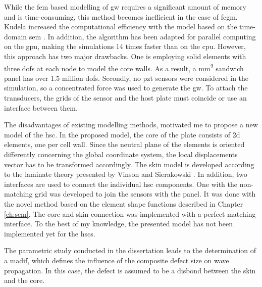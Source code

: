 While the \ac{fem} based modelling of \ac{gw} requires a significant amount of memory and is time-consuming, this method becomes inefficient in the case of \ac{fcgm}.
Kudela increased the computational efficiency with the model based on the time-domain \ac{sem} \cite{kudela2016parallel}.
In addition, the algorithm has been adapted for parallel computing on the \ac{gpu}, making the simulations 14 times faster than on the \ac{cpu}.
However, this approach has two major drawbacks. One is employing solid elements with three \acp{dof} at each node to model the core walls. As a result, a  \unit{\square\mm} sandwich panel has over 1.5 million \acp{dof}.
Secondly, no \ac{pzt} sensors were considered in the simulation, so a concentrated force was used to generate the \ac{gw}.
To attach the transducers, the grids of the sensor and the host plate must coincide or use an interface between them. 

The disadvantages of existing modelling methods, motivated me to propose a new model of the \ac{hsc}.
In the proposed model, the core of the plate consists of \ac{2d} elements, one per cell wall.
Since the neutral plane of the elements is oriented differently concerning the global coordinate system, the local displacements vector has to be transformed accordingly.
The skin model is developed according to the laminate theory presented by Vinson and Sierakowski \cite{vinson1993behavior}.
In addition, two interfaces are used to connect the individual \ac{hsc} components.
One with the non-matching grid was developed to join the sensors with the panel.
It was done with the novel method based on the element shape functions described in Chapter \ref{ch:sem}.
The core and skin connection was implemented with a perfect matching interface.
To the best of my knowledge, the presented model has not been implemented yet for the \acp{hsc}.

The parametric study conducted in the dissertation leads to the determination of a \ac{madif}, which defines the influence of the composite defect size on wave propagation.
In this case, the defect is assumed to be a disbond between the skin and the core.